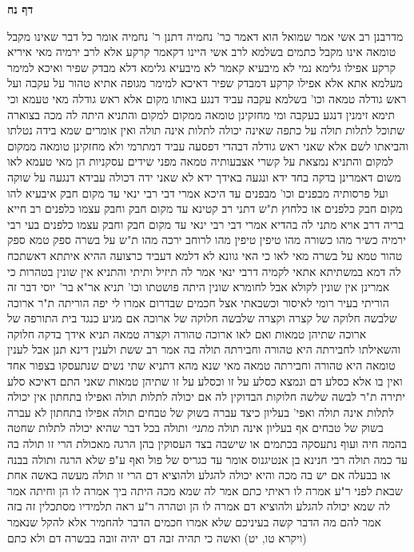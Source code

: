 \documentclass[12pt, openany]{book}
\newcommand{\sethebfont}{
\fontsize{10.5pt}{21.0pt} \selectfont
}
\newcommand{\twocol}[1]{
	{\sethebfont \begin{multicols}{2}
			#1
	\end{multicols}}	
}
\newcommand{\sectname}{}
\newcommand{\newsection}[1]{
	\addcontentsline{toc}{section}{#1}
	\renewcommand{\sectname}{#1}	
	\vspace{-\baselineskip}
	\begin{center}
		\textbf{%
\fontsize{16pt}{16pt}\selectfont
			#1}
	\end{center}
	\vspace{-\baselineskip}
	\nopagebreak
}
\begin{document}
\newsection{דף נח}
\twocol{מדרבנן 
רב אשי אמר  שמואל הוא דאמר כר' נחמיה  דתנן ר' נחמיה אומר  כל דבר שאינו מקבל טומאה אינו מקבל כתמים 
בשלמא לרב אשי היינו דקאמר קרקע אלא לרב ירמיה מאי איריא קרקע  אפילו גלימא נמי  לא מיבעיא קאמר
לא מיבעיא גלימא דלא מבדק שפיר ואיכא למימר מעלמא אתא אלא אפילו קרקע דמבדק שפיר דאיכא למימר מגופה אתיא טהור
על עקבה ועל ראש גודלה טמאה וכו' בשלמא עקבה עביד דנגע באותו מקום אלא ראש גודלה מאי טעמא  וכי תימא  זימנין דנגע בעקבה ומי מחזקינן טומאה ממקום למקום 
והתניא  היתה לה מכה בצוארה שתוכל לתלות תולה על כתפה שאינה יכולה לתלות אינה תולה
ואין אומרים שמא בידה נטלתו והביאתו לשם  אלא  שאני ראש גודלה דבהדי דפסעה עביד דמתרמי 
ולא מחזקינן טומאה ממקום למקום  והתניא  נמצאת על קשרי אצבעותיה טמאה מפני שידים עסקניות הן 
מאי טעמא לאו משום דאמרינן  בדקה בחד ידא ונגעה באידך ידא  לא שאני ידה דכולה עבידא דנגעה
על שוקה ועל פרסותיה מבפנים וכו' מבפנים עד היכא  אמרי דבי רבי ינאי  עד מקום חבק 
איבעיא להו  מקום חבק כלפנים או כלחוץ  ת"ש דתני רב קטינא  עד מקום חבק וחבק עצמו כלפנים  רב חייא בריה דרב אויא מתני לה בהדיא אמרי דבי רבי ינאי  עד מקום חבק וחבק עצמו כלפנים 
בעי רבי ירמיה  כשיר מהו כשורה מהו טיפין טיפין מהו לרוחב ירכה מהו 
ת"ש  על בשרה ספק טמא ספק טהור טמא  על בשרה מאי לאו כי האי גוונא  לא דלמא דעביד כרצועה 
ההיא איתתא דאשתכח לה דמא במשתיתא אתאי לקמיה דרבי ינאי אמר לה  תיזיל ותיתי 
והתניא  אין שונין בטהרות  כי אמרינן אין שונין לקולא אבל לחומרא שונין
היתה פושטתו וכו' תניא אר"א בר' יוסי  דבר זה הוריתי בעיר רומי לאיסור  וכשבאתי אצל חכמים שבדרום אמרו לי יפה הוריתה 
ת"ר  ארוכה שלבשה חלוקה של קצרה וקצרה שלבשה חלוקה של ארוכה אם מגיע כנגד בית התורפה של ארוכה שתיהן טמאות  ואם לאו ארוכה טהורה וקצרה טמאה 
תניא אידך  בדקה חלוקה והשאילתו לחבירתה היא טהורה וחבירתה תולה בה  אמר רב ששת  ולענין דינא תנן אבל לענין טומאה היא טהורה וחבירתה טמאה
מאי שנא מהא דתניא  שתי נשים שנתעסקו בצפור אחד ואין בו אלא כסלע דם ונמצא כסלע על זו וכסלע על זו שתיהן טמאות  שאני התם דאיכא סלע יתירה 
ת"ר  לבשה שלשה חלוקות הבדוקין לה אם יכולה לתלות תולה ואפילו בתחתון  אין יכולה לתלות אינה תולה ואפי' בעליון 
כיצד עברה בשוק של טבחים תולה אפילו בתחתון  לא עברה בשוק של טבחים אף בעליון אינה תולה
{\large\emph{מתני׳}} ותולה בכל דבר שהיא יכולה לתלות שחטה בהמה חיה ועוף נתעסקה בכתמים או שישבה בצד העסוקין בהן הרגה מאכולת הרי זו תולה בה 
עד כמה תולה  רבי חנינא בן אנטיגנוס אומר  עד כגריס של פול ואף ע"פ שלא הרגה  ותולה בבנה או בבעלה  אם יש בה מכה והיא יכולה להגלע ולהוציא דם הרי זו תולה 
מעשה באשה אחת שבאת לפני ר"ע אמרה לו  ראיתי כתם  אמר לה  שמא מכה היתה ביך  אמרה לו  הן וחיתה  אמר לה  שמא יכולה להגלע ולהוציא דם  אמרה לו  הן  וטהרה ר"ע 
ראה תלמידיו מסתכלין זה בזה אמר להם  מה הדבר קשה בעיניכם  שלא אמרו חכמים הדבר להחמיר אלא להקל שנאמר  (ויקרא טו, יט) ואשה כי תהיה זבה דם יהיה זובה בבשרה דם ולא כתם 
}
\end{document}

